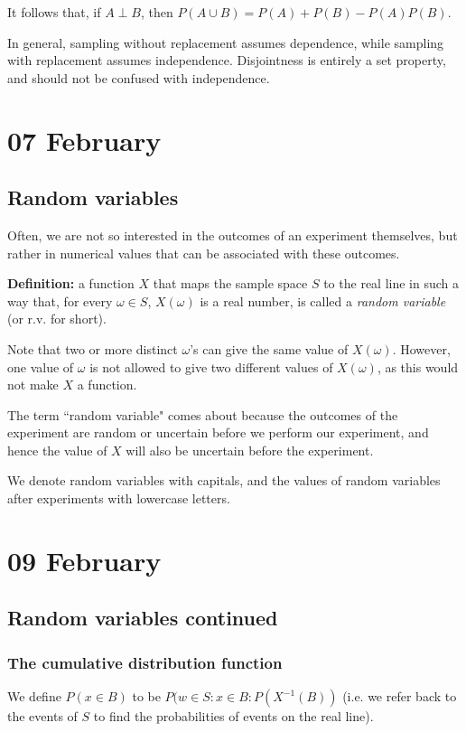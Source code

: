 \documentclass[12pt]{article}
\begin{document}
It follows that, if $A \perp B$, then $P(A \cup B) = P(A) + P(B) - P(A) P(B)$.

In general, sampling without replacement assumes dependence, while sampling with replacement assumes independence.  Disjointness is entirely a set property, and should not be confused with independence.  

\section{07 February} 
\subsection{Random variables}
Often, we are not so interested in the outcomes of an experiment themselves, but rather in numerical values that can be associated with these outcomes. 

\textbf{Definition:} a function $X$ that maps the sample space $S$ to the real line in such a way that, for every $\omega \in S$, $X(\omega)$ is a real number, is called a \emph{random variable} (or r.v. for short). 

Note that two or more distinct $\omega$'s can give the same value of $X(\omega)$. However, one value of $\omega$ is not allowed to give two different values of $X(\omega)$, as this would not make $X$ a function.

The term ``random variable" comes about because the outcomes of the experiment are random or uncertain before we perform our experiment, and hence the value of $X$ will also be uncertain before the experiment.

We denote random variables with capitals, and the values of random variables after experiments with lowercase letters.

\section{09 February}
\subsection{Random variables continued}
\subsubsection{The cumulative distribution function}
We define $P(x \in B)$ to be $P(w \in S : x \in B : P(X^{-1} (B))$ (i.e. we refer back to the events of $S$ to find the probabilities of events on the real line).
\end{document}
